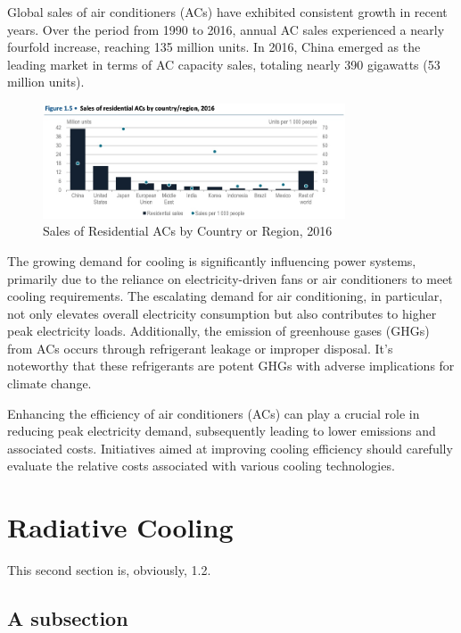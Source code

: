 Global sales of air conditioners (ACs) have exhibited consistent growth in recent years. Over the period from 1990 to 2016, annual AC sales experienced a nearly fourfold increase, reaching 135 million units. In 2016, China emerged as the leading market in terms of AC capacity sales, totaling nearly 390 gigawatts (53 million units). %

\begin{figure}
  \centering
  \includegraphics[width=0.8\textwidth]{Chapters/Figures/Sales of Residential ACs by Country or Region, 2016.jpg}
  \caption{Sales of Residential ACs by Country or Region, 2016}
\end{figure}

The growing demand for cooling is significantly influencing power systems, primarily due to the reliance on electricity-driven fans or air conditioners to meet cooling requirements. The escalating demand for air conditioning, in particular, not only elevates overall electricity consumption but also contributes to higher peak electricity loads. Additionally, the emission of greenhouse gases (GHGs) from ACs occurs through refrigerant leakage or improper disposal. It's noteworthy that these refrigerants are potent GHGs with adverse implications for climate change. %

Enhancing the efficiency of air conditioners (ACs) can play a crucial role in reducing peak electricity demand, subsequently leading to lower emissions and associated costs. Initiatives aimed at improving cooling efficiency should carefully evaluate the relative costs associated with various cooling technologies.

\section{Radiative Cooling}


This second section is, obviously, 1.2.

\subsection{A subsection}

